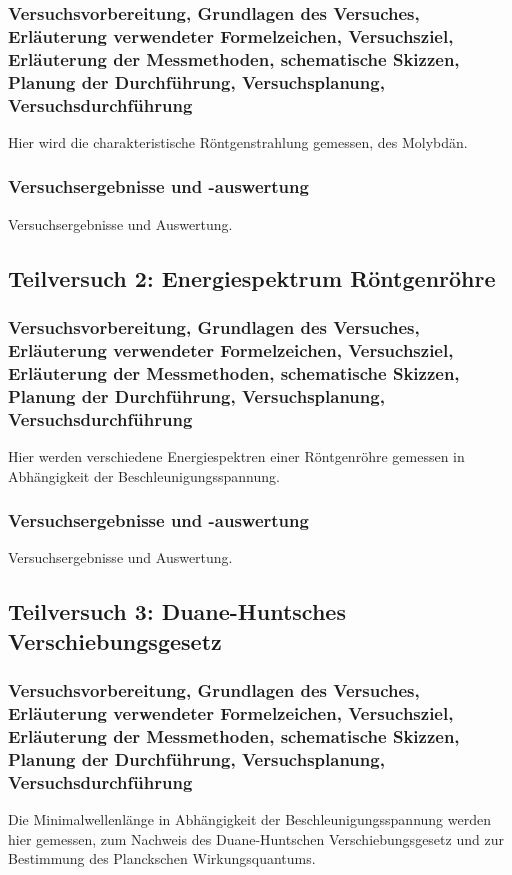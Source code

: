 \documentclass[12pt,oneside,oldfontcommands]{memoir}
\begin{document}
\subsubsection{Versuchsvorbereitung, Grundlagen des Versuches, Erläuterung verwendeter Formelzeichen, Versuchsziel, Erläuterung der Messmethoden, schematische Skizzen, Planung der Durchführung, Versuchsplanung, Versuchsdurchführung}

Hier wird die charakteristische Röntgenstrahlung gemessen, des Molybdän.

\subsubsection{Versuchsergebnisse und -auswertung}
Versuchsergebnisse und Auswertung.

\subsection{Teilversuch 2: Energiespektrum Röntgenröhre}
\subsubsection{Versuchsvorbereitung, Grundlagen des Versuches, Erläuterung verwendeter Formelzeichen, Versuchsziel, Erläuterung der Messmethoden, schematische Skizzen, Planung der Durchführung, Versuchsplanung, Versuchsdurchführung}
Hier werden verschiedene Energiespektren einer Röntgenröhre gemessen in Abhängigkeit der Beschleunigungsspannung.

\subsubsection{Versuchsergebnisse und -auswertung}
Versuchsergebnisse und Auswertung.

\subsection{Teilversuch 3: Duane-Huntsches Verschiebungsgesetz}
\subsubsection{Versuchsvorbereitung, Grundlagen des Versuches, Erläuterung verwendeter Formelzeichen, Versuchsziel, Erläuterung der Messmethoden, schematische Skizzen, Planung der Durchführung, Versuchsplanung, Versuchsdurchführung}
Die Minimalwellenlänge in Abhängigkeit der Beschleunigungsspannung werden hier gemessen, zum Nachweis des Duane-Huntschen Verschiebungsgesetz und zur Bestimmung des Planckschen Wirkungsquantums.
\end{document}
